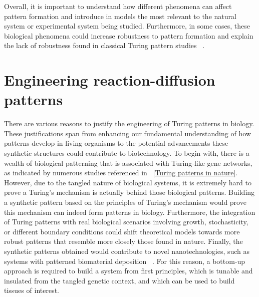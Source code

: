 Overall, it is important to understand how different phenomena can affect pattern formation and introduce in models the most relevant to the natural system or experimental system being studied.
Furthermore, in some cases, these biological phenomena could increase robustness to pattern formation and explain the lack of robustness found in classical Turing pattern studies ~\parencite{Scholes2019}.
%



\section{ Engineering reaction-diffusion patterns}
There are various reasons to justify the engineering of Turing patterns in biology.
These justifications span from enhancing our fundamental understanding of how patterns develop in living organisms to the potential advancements these synthetic structures could contribute to biotechnology.
To begin with, there is a wealth of biological patterning that is associated with Turing-like gene networks, as indicated by numerous studies referenced in ~\ref{Turing patterns in nature}.
However, due to the tangled nature of biological systems, it is extremely hard to prove a Turing’s mechanism is actually behind those biological patterns.
Building a synthetic pattern based on the principles of Turing's mechanism would prove this mechanism can indeed form patterns in biology.
Furthermore, the integration of Turing patterns with real biological scenarios involving growth, stochasticity, or different boundary conditions could shift theoretical models towards more robust patterns that resemble more closely those found in nature.
Finally, the synthetic patterns obtained would contribute to novel nanotechnologies, such as systems with patterned biomaterial deposition ~\parencite{Din2020, Cao2017}.
For this reason, a bottom-up approach is required to build a system from first principles, which is tunable and insulated from the tangled genetic context, and which can be used to build tissues of interest.



